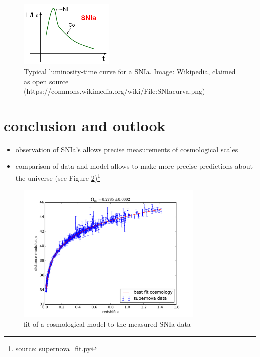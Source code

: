 \documentclass[a4paper, 11pt]{article}
\begin{document}
        \begin{figure}
          \label{supcurv}
          \centering
          \includegraphics[width=0.4\textwidth]{SNIacurva.png}
          \caption{Typical luminosity-time curve for a SNIa. \newline \hfill Image: Wikipedia, claimed as open source (https://commons.wikimedia.org/wiki/File:SNIacurva.png)}
        \end{figure}
  \section{conclusion and outlook}
    \begin{itemize}
      \item observation of SNIa's allows precise measurements of cosmological scales
      \item comparison of data and model allows to make more precise predictions about the universe (see Figure \ref{modfit})\footnote{source: \url{supernova_fit.py}}
    \end{itemize}
    \begin{figure}%
      \label{modfit}
      \centering
      \includegraphics[width=0.8\textwidth]{supernova_fit.pdf}
      \caption{fit of a cosmological model to the measured SNIa data}
    \end{figure}
\end{document}
